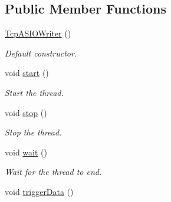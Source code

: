 \subsection*{Public Member Functions}
\begin{DoxyCompactItemize}
\item 
\hypertarget{classmognetwork_1_1_tcp_a_s_i_o_writer_ad9ccc4046f754b839e79263c54baa3d6}{\hyperlink{classmognetwork_1_1_tcp_a_s_i_o_writer_ad9ccc4046f754b839e79263c54baa3d6}{Tcp\-A\-S\-I\-O\-Writer} ()}\label{classmognetwork_1_1_tcp_a_s_i_o_writer_ad9ccc4046f754b839e79263c54baa3d6}

\begin{DoxyCompactList}\small\item\em Default constructor. \end{DoxyCompactList}\item 
\hypertarget{classmognetwork_1_1_tcp_a_s_i_o_writer_ac7adf2ec565c463b28f7b584be565863}{void \hyperlink{classmognetwork_1_1_tcp_a_s_i_o_writer_ac7adf2ec565c463b28f7b584be565863}{start} ()}\label{classmognetwork_1_1_tcp_a_s_i_o_writer_ac7adf2ec565c463b28f7b584be565863}

\begin{DoxyCompactList}\small\item\em Start the thread. \end{DoxyCompactList}\item 
\hypertarget{classmognetwork_1_1_tcp_a_s_i_o_writer_a72d4c74cb2fb05c23f6245de796a0928}{void \hyperlink{classmognetwork_1_1_tcp_a_s_i_o_writer_a72d4c74cb2fb05c23f6245de796a0928}{stop} ()}\label{classmognetwork_1_1_tcp_a_s_i_o_writer_a72d4c74cb2fb05c23f6245de796a0928}

\begin{DoxyCompactList}\small\item\em Stop the thread. \end{DoxyCompactList}\item 
\hypertarget{classmognetwork_1_1_tcp_a_s_i_o_writer_ad3bd21b81839315d4409914f30de8652}{void \hyperlink{classmognetwork_1_1_tcp_a_s_i_o_writer_ad3bd21b81839315d4409914f30de8652}{wait} ()}\label{classmognetwork_1_1_tcp_a_s_i_o_writer_ad3bd21b81839315d4409914f30de8652}

\begin{DoxyCompactList}\small\item\em Wait for the thread to end. \end{DoxyCompactList}\item 
\hypertarget{classmognetwork_1_1_tcp_a_s_i_o_writer_a69906d01efaf03f6a2d5987e2f54ba87}{void \hyperlink{classmognetwork_1_1_tcp_a_s_i_o_writer_a69906d01efaf03f6a2d5987e2f54ba87}{trigger\-Data} ()}\label{classmognetwork_1_1_tcp_a_s_i_o_writer_a69906d01efaf03f6a2d5987e2f54ba87}


\end{DoxyCompactItemize}
